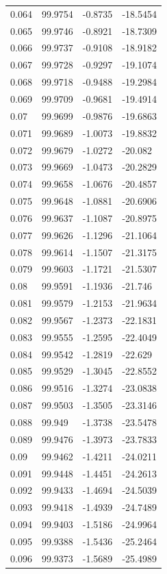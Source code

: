 \begin{tabular}{llll}
0.064 & 99.9754 & -0.8735 & -18.5454 \\
0.065 & 99.9746 & -0.8921 & -18.7309 \\
0.066 & 99.9737 & -0.9108 & -18.9182 \\
0.067 & 99.9728 & -0.9297 & -19.1074 \\
0.068 & 99.9718 & -0.9488 & -19.2984 \\
0.069 & 99.9709 & -0.9681 & -19.4914 \\
0.07 & 99.9699 & -0.9876 & -19.6863 \\
0.071 & 99.9689 & -1.0073 & -19.8832 \\
0.072 & 99.9679 & -1.0272 & -20.082 \\
0.073 & 99.9669 & -1.0473 & -20.2829 \\
0.074 & 99.9658 & -1.0676 & -20.4857 \\
0.075 & 99.9648 & -1.0881 & -20.6906 \\
0.076 & 99.9637 & -1.1087 & -20.8975 \\
0.077 & 99.9626 & -1.1296 & -21.1064 \\
0.078 & 99.9614 & -1.1507 & -21.3175 \\
0.079 & 99.9603 & -1.1721 & -21.5307 \\
0.08 & 99.9591 & -1.1936 & -21.746 \\
0.081 & 99.9579 & -1.2153 & -21.9634 \\
0.082 & 99.9567 & -1.2373 & -22.1831 \\
0.083 & 99.9555 & -1.2595 & -22.4049 \\
0.084 & 99.9542 & -1.2819 & -22.629 \\
0.085 & 99.9529 & -1.3045 & -22.8552 \\
0.086 & 99.9516 & -1.3274 & -23.0838 \\
0.087 & 99.9503 & -1.3505 & -23.3146 \\
0.088 & 99.949 & -1.3738 & -23.5478 \\
0.089 & 99.9476 & -1.3973 & -23.7833 \\
0.09 & 99.9462 & -1.4211 & -24.0211 \\
0.091 & 99.9448 & -1.4451 & -24.2613 \\
0.092 & 99.9433 & -1.4694 & -24.5039 \\
0.093 & 99.9418 & -1.4939 & -24.7489 \\
0.094 & 99.9403 & -1.5186 & -24.9964 \\
0.095 & 99.9388 & -1.5436 & -25.2464 \\
0.096 & 99.9373 & -1.5689 & -25.4989 \\

\end{tabular}
